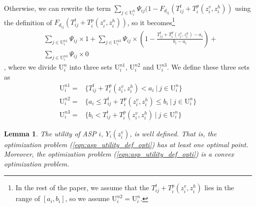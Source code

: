 \documentclass[conference]{IEEEtran}
\newtheorem{lemma}{Lemma}
\begin{document}
Otherwise, we can rewrite the term $\sum_{j \in \mathrm{U}_i^n}\Psi_{ij}(1-F_{d_{ij}}(T_{ij}^t+T_i^p(z_i^v, z_i^h))$ using the definition of $F_{d_{ij}}(T_{ij}^t+T_i^p(z_i^v, z_i^h))$, so it becomes\footnote{In the rest of the paper, we assume that the $T_{ij}^t+T_i^p(z_i^v, z_i^h)$ lies in the range of $[a_i, b_i]$, so we assume $\mathrm{U}_i^{n2} = \mathrm{U}_i^{n}$.}
\begin{equation}
\begin{aligned}
&\sum_{j \in \mathrm{U}_i^{n1}}\Psi_{ij} \times 1 +\sum_{j \in \mathrm{U}_i^{n2}}\Psi_{ij} \times (1-\frac{T_{ij}^t+T_i^p(z_i^v, z_i^h)-a_i}{b_i-a_i})+\\
&\sum_{j \in \mathrm{U}_i^{n3}}\Psi_{ij} \times 0
\end{aligned}
\end{equation}
, where we divide $\mathrm{U}_i^{n}$ into three sets $\mathrm{U}_i^{n1}$, $\mathrm{U}_i^{n2}$ and $\mathrm{U}_i^{n3}$.
We define these three sets as 
\begin{subequations}\label{normal_set_user}
\begin{align}
\mathrm{U}_i^{n1} =& \{T_{ij}^t+T_i^p(z_i^v, z_i^h) < a_i\ |\ j \in \mathrm{U}_i^{n}\}\label{normal_set_user_1} \\
\mathrm{U}_i^{n2} =& \{a_i \leq T_{ij}^t+T_i^p(z_i^v, z_i^h) \leq b_i\ |\ j \in \mathrm{U}_i^{n}\}\label{normal_set_user_2} \\
\mathrm{U}_i^{n3} =& \{ b_i < T_{ij}^t+T_i^p(z_i^v, z_i^h) \ |\ j \in \mathrm{U}_i^{n}\}\label{normal_set_user_3}
\end{align}
\end{subequations}
\begin{lemma}
The utility of ASP $i$, $Y_i(z_i^v)$, is well defined. That is, the optimization problem (\ref{eqn:asp_utility_def_opti}) has at least one optimal point. Moreover, the optimization problem (\ref{eqn:asp_utility_def_opti}) is a convex optimization problem.
\end{lemma}
\end{document}
